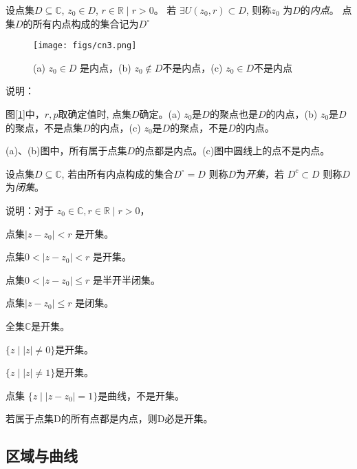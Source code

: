 \begin{definition}\label{}\index{}
	设点集$D \subseteq \mathbb{C}$, $z_0 \in D $, $  r  \in \mathbb{R} \mid  r  > 0 $。 若 $ \exists U (z_0,  r ) \subset D $, 则称$z_0$ 为$D$的\emph{内点}。 点集$D$的所有内点构成的集合记为$D^\circ $
    \begin{figure}[htbp]
        \centering
        \texttt{[image: figs/cn3.png]}
        \caption{ (a) $z_0 \in D$ 是内点，(b) $z_0 \notin D$不是内点，(c) $z_0 \in D$不是内点}
        \label{fig:ndacj}
      \end{figure} 
\end{definition}
说明：
\begin{compactitem}
    \item 图[\ref{fig:ndacj}]中，$r,p$取确定值时, 点集$D$确定。(a) $z_0$是$D$的聚点也是$D$的内点，(b) $z_0$是$D$的聚点，不是点集$D$的内点，(c) $z_0$是$D$的聚点，不是$D$的内点。 
    \item  (a)、(b)图中，所有属于点集$D$的点都是内点。(c)图中圆线上的点不是内点。 
\end{compactitem}

\begin{definition}\label{}\index{}
	设点集$D \subseteq \mathbb{C}$, 若由所有内点构成的集合$ D^\circ = D $ 则称$D$为\emph{开集}，若 $ D^c \subset D $ 则称$D$为\emph{闭集}。
\end{definition}
说明：对于 $ z_0 \in \mathbb{C}, r  \in \mathbb{R} \mid  r  > 0 $，
\begin{compactitem}
    \item  点集$ \left\vert z - z_0 \right\vert < r$ 是开集。  
    \item  点集$ 0 < \left\vert z - z_0 \right\vert < r$ 是开集。 
    \item  点集$ 0 < \left\vert z - z_0 \right\vert \le r$ 是半开半闭集。   
    \item  点集$ \left\vert z - z_0 \right\vert \le r$ 是闭集。 
    \item 全集$\mathbb{C}$是开集。 
    \item $\{z  \mid |z| \ne 0 \}$是开集。
    \item $\{z  \mid |z| \ne 1 \}$是开集。
    \item 点集 $\{z  \mid |z - z_0| = 1 \}$是曲线，不是开集。
    \item 若属于点集D的所有点都是内点，则D必是开集。
\end{compactitem} 

\subsection{区域与曲线}~\\

